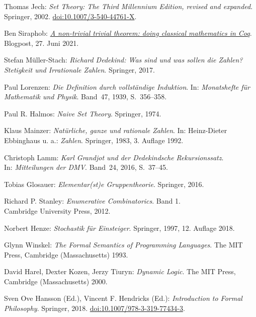 \begin{thebibliography}{00}
 Thomas Jech: \emph{Set Theory: The Third Millennium
Edition, revised and expanded}. Springer, 2002.
\href{https://doi.org/10.1007/3-540-44761-X}{doi:10.1007/3-540-44761-X}.

 Ben Siraphob:
\href{https://siraben.dev/2021/06/27/classical-math-coq.html}{%
\emph{A non-trivial trivial theorem: doing classical mathematics in Coq}}.
Blogpost, 27. Juni 2021.

 Stefan Müller-Stach:
\emph{Richard Dedekind: Was sind und was sollen die Zahlen?
Stetigkeit und Irrationale Zahlen}. Springer, 2017.

 Paul Lorenzen:
\emph{Die Definition durch vollständige Induktion}.
In: \emph{Monatshefte für Mathematik und Physik}.
Band~47, 1939, S.~356--358.

 Paul R. Halmos:
\emph{Naive Set Theory}. Springer, 1974.

 Klaus Mainzer:
\emph{Natürliche, ganze und rationale Zahlen}.
In: Heinz-Dieter Ebbinghaus u. a.: \emph{Zahlen}.
Springer, 1983, 3. Auflage 1992.

 Christoph Lamm:
\emph{Karl Grandjot und der Dedekindsche Rekursionssatz}.\\
In: \emph{Mitteilungen der DMV}. Band~24, 2016, S.~37--45.

 Tobias Glosauer:
\emph{Elementar(st)e Gruppentheorie}.
Springer, 2016.

 Richard P. Stanley:
\emph{Enumerative Combinatorics}. Band 1.\\
Cambridge University Press, 2012.

 Norbert Henze: \emph{Stochastik für Einsteiger}.
Springer, 1997, 12. Auflage 2018.

 Glynn Winskel:
\emph{The Formal Semantics of Programming Languages}.
The MIT Press, Cambridge (Massachusetts) 1993.

 David Harel, Dexter Kozen, Jerzy Tiuryn:
\emph{Dynamic Logic}.
The MIT Press, Cambridge (Massachusetts) 2000.

 Sven Ove Hansson (Ed.), Vincent F. Hendricks (Ed.):
\emph{Introduction to Formal Philosophy}. Springer, 2018.
\href{https://doi.org/10.1007/978-3-319-77434-3}{doi:10.1007/978-3-319-77434-3}.

\end{thebibliography}

